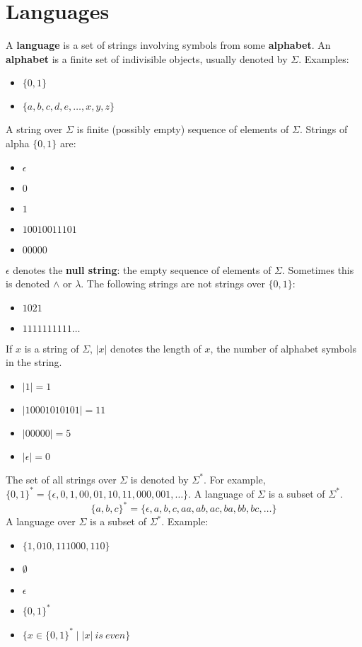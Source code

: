 \documentclass[letterpaper, 12pt]{math}
\begin{document}
\section*{Languages}
A \textbf{language} is a set of strings involving symbols from some
\textbf{alphabet}. An \textbf{alphabet} is a finite set of
indivisible objects, usually denoted by \( \Sigma \). Examples:
\begin{itemize}
  \item \( \{0,1\} \)
  \item \( \{a,b,c,d,e,\dots,x,y,z\} \)
\end{itemize}

A string over \( \Sigma \) is finite (possibly empty) sequence of elements of
\( \Sigma \). Strings of alpha \( \{0,1\} \) are:
\begin{itemize}
  \item \( \epsilon \)
  \item \( 0 \)
  \item \( 1 \)
  \item \( 10010011101 \)
  \item \( 00000 \)
\end{itemize}

\( \epsilon \) denotes the \textbf{null string}: the empty sequence of elements
of \( \Sigma \). Sometimes this is denoted \( \wedge \) or \( \lambda \). The
following strings are not strings over \( \{0,1\} \):
\begin{itemize}
  \item \( 1021 \)
  \item \( 1111111111\dots \)
\end{itemize}

If \( x \) is a string of \( \Sigma \), \( |x| \) denotes the length of \( x \),
the number of alphabet symbols in the string.
\begin{itemize}
  \item \( |1| = 1 \)
  \item \( |10001010101| = 11 \)
  \item \( |00000| = 5 \)
  \item \( |\epsilon| = 0 \)
\end{itemize}

The set of all strings over \( \Sigma \) is denoted by \( \Sigma^* \).
For example, \( \{0,1\}^* = \{\epsilon,0,1,00,01,10,11,000,001,\dots\} \).
A language of \( \Sigma \) is a subset of \( \Sigma^* \).
\[ \{a,b,c\}^* = \{\epsilon,a,b,c,aa,ab,ac,ba,bb,bc,\dots\} \]
A language over \( \Sigma \) is a subset of \( \Sigma^* \). Example:
\begin{itemize}
  \item \( \{1,010,111000,110\} \)
  \item \( \emptyset \)
  \item \( \epsilon \)
  \item \( \{0,1\}^* \)
  \item \( \{x\in\{0,1\}^*\mid |x|\ is\ even\} \)
\end{itemize}
\end{document}
